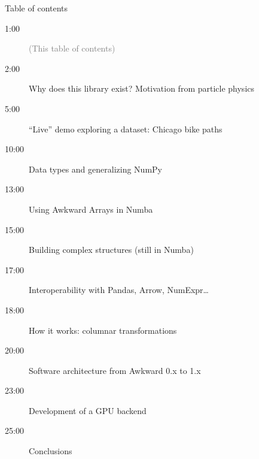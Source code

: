 \documentclass[aspectratio=169]{beamer}
\begin{document}
\begin{frame}{Table of contents}
\vspace{0.5 cm}

\large
\begin{description}
\item[1:00\hspace{0.5 cm}] \textcolor{gray}{(This table of contents)}
\item[2:00\hspace{0.5 cm}] Why does this library exist? Motivation from particle physics
\item[5:00\hspace{0.5 cm}] ``Live'' demo exploring a dataset: Chicago bike paths
\item[10:00\hspace{0.5 cm}] Data types and generalizing NumPy
\item[13:00\hspace{0.5 cm}] Using Awkward Arrays in Numba
\item[15:00\hspace{0.5 cm}] Building complex structures (still in Numba)
\item[17:00\hspace{0.5 cm}] Interoperability with Pandas, Arrow, NumExpr\ldots
\item[18:00\hspace{0.5 cm}] How it works: columnar transformations
\item[20:00\hspace{0.5 cm}] Software architecture from Awkward 0.x to 1.x
\item[23:00\hspace{0.5 cm}] Development of a GPU backend
\item[25:00\hspace{0.5 cm}] Conclusions
\end{description}
\end{frame}

\begin{frame}{}

\end{frame}
\end{document}
